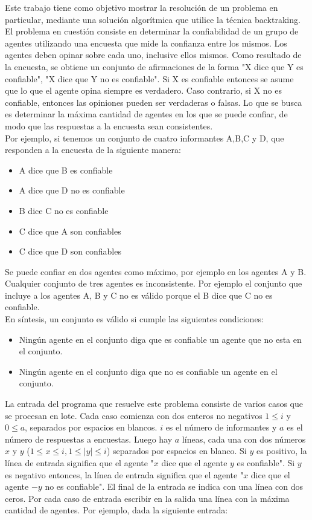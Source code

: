 \documentclass{article}
\begin{document}
Este trabajo tiene como objetivo mostrar la resolución de un problema en particular, mediante una solución algorítmica que utilice la técnica backtraking.
El problema en cuestión consiste en determinar la confiabilidad de un grupo de agentes utilizando una encuesta que mide la confianza entre los mismos. Los agentes deben opinar sobre cada uno, inclusive ellos mismos.
Como resultado de la encuesta, se obtiene un conjunto de afirmaciones de la forma "X dice que Y es confiable", "X dice que Y no es confiable". Si X es confiable entonces se asume que lo que el agente opina siempre es verdadero. Caso contrario, si X no es confiable, entonces las opiniones pueden ser verdaderas o falsas. Lo que se busca es determinar la máxima cantidad de agentes en los que se puede confiar, de modo que las respuestas a la encuesta sean consistentes. \\
Por ejemplo, si tenemos un conjunto de cuatro informantes A,B,C y D, que responden a la encuesta de la siguiente manera:
\begin{itemize}
	\item A dice que B es confiable
	\item A dice que D no es confiable
	\item B dice C no es confiable
	\item C dice que A son confiables
	\item C dice que D son confiables
\end{itemize}
Se puede confiar en dos agentes como máximo, por ejemplo en los agentes A y B. Cualquier conjunto de tres agentes es inconsistente. Por ejemplo el conjunto que incluye a los agentes A, B y C no es válido porque el B dice que C no es confiable.\\
En síntesis, un conjunto es válido si cumple las siguientes condiciones:
\begin{itemize}
	\item Ningún agente en el conjunto diga que es confiable un agente que no esta en el conjunto.
	\item Ningún agente en el conjunto diga que no es confiable un agente en el conjunto.
\end{itemize}
La entrada del programa que resuelve este problema consiste de varios casos que se procesan en lote. Cada caso comienza con dos enteros no negativos $1 \leq i$ y $0 \leq a$, separados por espacios en blancos. $i$ es el número de informantes y $a$ es el número de respuestas a encuestas. Luego hay $a$ líneas, cada una con dos números $x$ y $y$ ($1 \leq x \leq i, 1 \leq |y| \leq i$) separados por espacios en blanco. Si $y$ es positivo, la línea de entrada significa que el agente "$x$ dice que el agente $y$ es confiable". Si $y$ es negativo entonces, la línea de entrada significa que el agente "$x$ dice que el agente $-y$ no es confiable". El final de la entrada se indica con una línea con dos ceros. Por cada caso de entrada escribir en la salida una línea con la máxima cantidad de agentes. Por ejemplo, dada la siguiente entrada: \\
\end{document}
